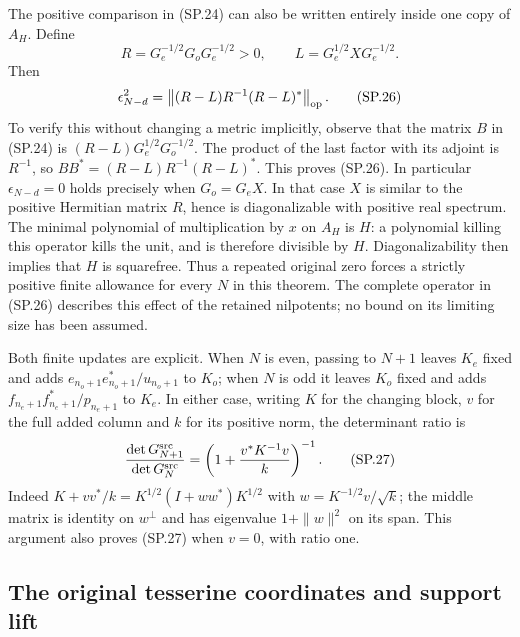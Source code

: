 The positive comparison in (SP.24) can also be written entirely
inside one copy of \(A_H\). Define
\[
 R=G_e^{-1/2}G_oG_e^{-1/2}>0,\qquad
 L=G_e^{1/2}XG_e^{-1/2}.
 \tag{SP.25}
\]
Then
\[
 \epsilon_{N-d}^2
   =\left\|(R-L)R^{-1}(R-L)^*\right\|_{\rm op}.
 \tag{SP.26}
\]
To verify this without changing a metric implicitly, observe that
the matrix \(B\) in (SP.24) is \((R-L)G_e^{1/2}G_o^{-1/2}\).
The product of the last factor with its adjoint is \(R^{-1}\),
so \(BB^*=(R-L)R^{-1}(R-L)^*\). This proves (SP.26).
In particular \(\epsilon_{N-d}=0\) holds precisely when
\(G_o=G_eX\). In that case \(X\) is similar to the positive
Hermitian matrix \(R\), hence is diagonalizable with positive
real spectrum. The minimal polynomial of multiplication by \(x\)
on \(A_H\) is \(H\): a polynomial killing this operator kills
the unit, and is therefore divisible by \(H\). Diagonalizability
then implies that \(H\) is squarefree. Thus a repeated original
zero forces a strictly positive finite allowance for every \(N\)
in this theorem. The complete operator in (SP.26) describes this
effect of the retained nilpotents; no bound on its limiting size
has been assumed.

Both finite updates are explicit. When \(N\) is even, passing
to \(N+1\) leaves \(K_e\) fixed and adds
\(e_{n_o+1}e_{n_o+1}^*/u_{n_o+1}\) to \(K_o\); when \(N\) is
odd it leaves \(K_o\) fixed and adds
\(f_{n_e+1}f_{n_e+1}^*/p_{n_e+1}\) to \(K_e\). In either case,
writing \(K\) for the changing block, \(v\) for the full added
column and \(k\) for its positive norm, the determinant ratio is
\[
 \frac{\det G_{N+1}^{\rm src}}{\det G_N^{\rm src}}
       =\left(1+\frac{v^*K^{-1}v}{k}\right)^{-1}.
 \tag{SP.27}
\]
Indeed \(K+vv^*/k=K^{1/2}(I+ww^*)K^{1/2}\) with
\(w=K^{-1/2}v/\sqrt k\); the middle matrix is identity on
\(w^\perp\) and has eigenvalue \(1+\|w\|^2\) on its span.
This argument also proves (SP.27) when \(v=0\), with ratio one.

\subsection{The original tesserine coordinates and support lift}

